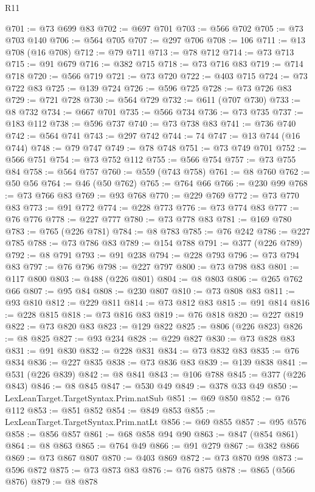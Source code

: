 \begin{lexlean}{R11}
\begin{coremodule}
@701 := @73 @699 @83
@702 := @697 @701
@703 := @566 @702
@705 := @73 @703 @140
@706 := @564 @705
@707 := @297 @706
@708 := 106
@711 := @13 @708 (@16 @708)
@712 := @79 @711
@713 := @78 @712
@714 := @73 @713
@715 := @91 @679
@716 := @382 @715
@718 := @73 @716 @83
@719 := @714 @718
@720 := @566 @719
@721 := @73 @720
@722 := @403 @715
@724 := @73 @722 @83
@725 := @139 @724
@726 := @596 @725
@728 := @73 @726 @83
@729 := @721 @728
@730 := @564 @729
@732 := @611 (@707 @730)
@733 := @8 @732
@734 := @667 @701
@735 := @566 @734
@736 := @73 @735
@737 := @183 @112
@738 := @596 @737
@740 := @73 @738 @83
@741 := @736 @740
@742 := @564 @741
@743 := @297 @742
@744 := 74
@747 := @13 @744 (@16 @744)
@748 := @79 @747
@749 := @78 @748
@751 := @73 @749 @701
@752 := @566 @751
@754 := @73 @752 @112
@755 := @566 @754
@757 := @73 @755 @84
@758 := @564 @757
@760 := @559 (@743 @758)
@761 := @8 @760
@762 := @50 @56
@764 := @46 (@50 @762)
@765 := @764 @66
@766 := @230 @99
@768 := @73 @766 @83
@769 := @93 @768
@770 := @229 @769
@772 := @73 @770 @83
@773 := @91 @772
@774 := @228 @773
@776 := @73 @774 @83
@777 := @76 @776
@778 := @227 @777
@780 := @73 @778 @83
@781 := @169 @780
@783 := @765 (@226 @781)
@784 := @8 @783
@785 := @76 @242
@786 := @227 @785
@788 := @73 @786 @83
@789 := @154 @788
@791 := @377 (@226 @789)
@792 := @8 @791
@793 := @91 @238
@794 := @228 @793
@796 := @73 @794 @83
@797 := @76 @796
@798 := @227 @797
@800 := @73 @798 @83
@801 := @117 @800
@803 := @488 (@226 @801)
@804 := @8 @803
@806 := @265 @762 @66
@807 := @95 @84
@808 := @230 @807
@810 := @73 @808 @83
@811 := @93 @810
@812 := @229 @811
@814 := @73 @812 @83
@815 := @91 @814
@816 := @228 @815
@818 := @73 @816 @83
@819 := @76 @818
@820 := @227 @819
@822 := @73 @820 @83
@823 := @129 @822
@825 := @806 (@226 @823)
@826 := @8 @825
@827 := @93 @234
@828 := @229 @827
@830 := @73 @828 @83
@831 := @91 @830
@832 := @228 @831
@834 := @73 @832 @83
@835 := @76 @834
@836 := @227 @835
@838 := @73 @836 @83
@839 := @139 @838
@841 := @531 (@226 @839)
@842 := @8 @841
@843 := @106 @788
@845 := @377 (@226 @843)
@846 := @8 @845
@847 := @530 @49
@849 := @378 @33 @49
@850 := LexLeanTarget.TargetSyntax.Prim.natSub
@851 := @69 @850
@852 := @76 @112
@853 := @851 @852
@854 := @849 @853
@855 := LexLeanTarget.TargetSyntax.Prim.natLt
@856 := @69 @855
@857 := @95 @576
@858 := @856 @857
@861 := @68 @858 @94 @90
@863 := @847 (@854 @861)
@864 := @8 @863
@865 := @764 @49
@866 := @91 @279
@867 := @382 @866
@869 := @73 @867 @807
@870 := @403 @869
@872 := @73 @870 @98
@873 := @596 @872
@875 := @73 @873 @83
@876 := @76 @875
@878 := @865 (@566 @876)
@879 := @8 @878

\end{coremodule}
\end{lexlean}
